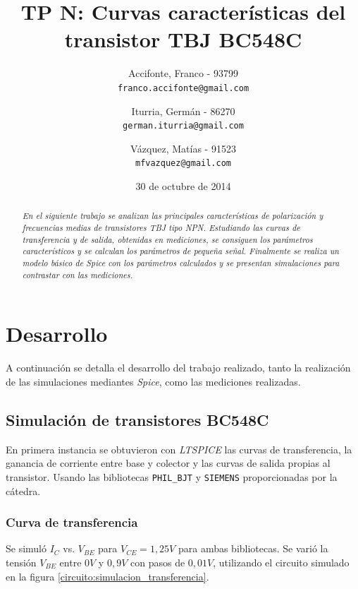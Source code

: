 \documentclass[10pt,spanish,a4paper,openany,notitlepage]{article}
\begin{document}
\title{\textbf{TP N: Curvas características del transistor TBJ BC548C}}
\author{
  Accifonte, Franco - 93799\\
  \texttt{franco.accifonte@gmail.com}  
  \and
  Iturria, Germán  - 86270 \\
  \texttt{german.iturria@gmail.com}
  \and
   Vázquez, Matías - 91523\\
  \texttt{mfvazquez@gmail.com}
}
\date{30 de octubre de 2014}
\maketitle

\begin{abstract} %
\emph{En el siguiente trabajo se analizan las principales características 
de polarización y frecuencias medias de transistores TBJ tipo NPN. 
Estudiando las curvas de transferencia y de salida, obtenidas en mediciones, 
se consiguen los parámetros característicos y se calculan los parámetros 
de pequeña señal. Finalmente se realiza un modelo básico de Spice con los 
parámetros calculados y se presentan simulaciones para contrastar con las mediciones.}
\end{abstract}

\section{Desarrollo}

A continuación se detalla el desarrollo del trabajo realizado, tanto la 
realización de las simulaciones mediantes \emph{Spice}, como las mediciones realizadas.

\subsection{Simulación de transistores BC548C}

En primera instancia se obtuvieron con \emph{LTSPICE} las curvas de transferencia, 
la ganancia de corriente entre base y colector y las curvas de salida  propias al transistor. Usando las bibliotecas  
 \texttt{PHIL\_BJT} y \texttt{SIEMENS} proporcionadas por la cátedra.

\subsubsection{Curva de transferencia}

Se simuló $I_C$ vs. $V_{BE}$ para $V_{CE} = 1,25 \unit{V}$ para ambas 
bibliotecas. Se varió la tensión $V_{BE}$ entre $0\unit{V}$ y $0,9\unit{V}$ 
con pasos de $0,01\unit{V}$, utilizando el circuito simulado en la figura \ref{circuito:simulacion_transferencia}.
\end{document}

